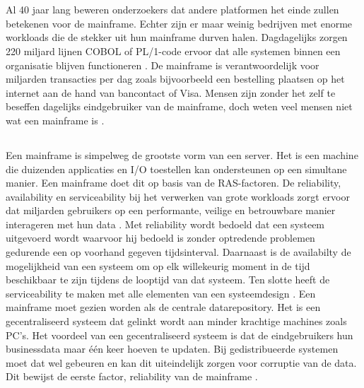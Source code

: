 
\chapter{}
\label{ch:inleiding}
Al 40  jaar lang beweren onderzoekers dat andere platformen het einde zullen betekenen voor de mainframe. Echter zijn er maar weinig bedrijven met enorme workloads die de stekker uit hun mainframe durven halen. Dagdagelijks zorgen 220 miljard lijnen COBOL of PL/1-code ervoor dat alle systemen binnen een organisatie blijven functioneren \autocite{Scannell2017}. De mainframe is verantwoordelijk voor miljarden transacties per dag zoals bijvoorbeeld een bestelling plaatsen op het internet aan de hand van bancontact of Visa. Mensen zijn zonder het zelf te beseffen dagelijks eindgebruiker van de mainframe, doch weten veel mensen niet wat een mainframe is \autocite{Scannell2017}. 

\section{}

Een mainframe is simpelweg de grootste vorm van een server. Het is een machine die duizenden applicaties en I/O toestellen kan ondersteunen op een simultane manier.  Een mainframe doet dit op basis van de RAS-factoren. De reliability, availability en serviceability bij het verwerken van grote workloads zorgt ervoor dat miljarden gebruikers op een performante, veilige en betrouwbare manier interageren met hun data \autocite{Ebbers2022}. Met reliability wordt bedoeld dat een systeem uitgevoerd wordt waarvoor hij bedoeld is zonder optredende problemen gedurende een op voorhand gegeven tijdsinterval. Daarnaast is de availabilty de mogelijkheid van een systeem om op elk willekeurig moment in de tijd beschikbaar te zijn tijdens de looptijd van dat systeem. Ten slotte heeft de serviceability te maken met alle elementen van een systeemdesign \autocite{Johnson1988}.  Een mainframe moet gezien worden als de centrale datarepository. Het is een gecentraliseerd systeem dat gelinkt wordt aan minder krachtige machines zoals PC's.  Het voordeel van een gecentraliseerd systeem is dat de eindgebruikers hun businessdata maar één keer hoeven te updaten. Bij gedistribueerde systemen moet dat wel gebeuren en kan dit uiteindelijk zorgen voor corruptie van de data. Dit bewijst de eerste factor, reliability van de mainframe \autocite{Ebbers2022}. 

